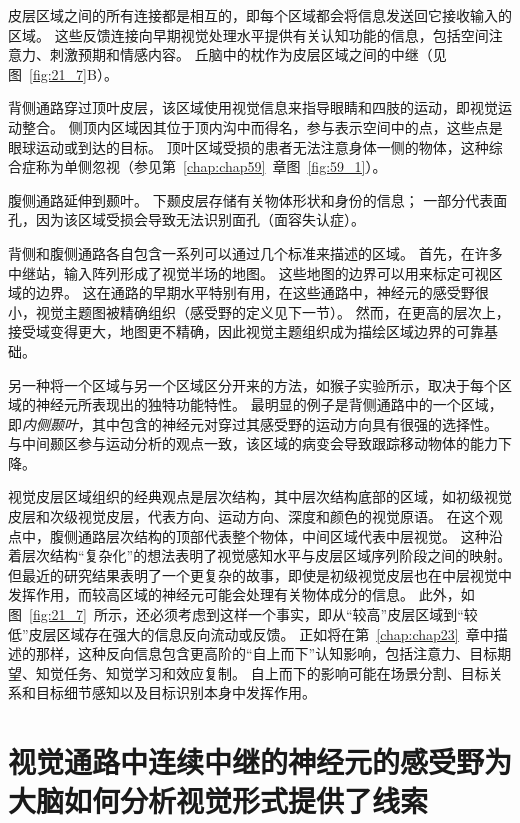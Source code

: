 皮层区域之间的所有连接都是相互的，即每个区域都会将信息发送回它接收输入的区域。
这些反馈连接向早期视觉处理水平提供有关认知功能的信息，包括空间注意力、刺激预期和情感内容。
丘脑中的枕作为皮层区域之间的中继（见图~\ref{fig:21_7}B）。


背侧通路穿过顶叶皮层，该区域使用视觉信息来指导眼睛和四肢的运动，即视觉运动整合。
侧顶内区域因其位于顶内沟中而得名，参与表示空间中的点，这些点是眼球运动或到达的目标。
顶叶区域受损的患者无法注意身体一侧的物体，这种综合症称为单侧忽视（参见第~\ref{chap:chap59}~章图~\ref{fig:59_1}）。


腹侧通路延伸到颞叶。
下颞皮层存储有关物体形状和身份的信息；
一部分代表面孔，因为该区域受损会导致无法识别面孔（面容失认症）。


背侧和腹侧通路各自包含一系列可以通过几个标准来描述的区域。
首先，在许多中继站，输入阵列形成了视觉半场的地图。 
这些地图的边界可以用来标定可视区域的边界。
这在通路的早期水平特别有用，在这些通路中，神经元的感受野很小，视觉主题图被精确组织（感受野的定义见下一节）。
然而，在更高的层次上，接受域变得更大，地图更不精确，因此视觉主题组织成为描绘区域边界的可靠基础。


另一种将一个区域与另一个区域区分开来的方法，如猴子实验所示，取决于每个区域的神经元所表现出的独特功能特性。
最明显的例子是背侧通路中的一个区域，即\textit{内侧颞叶}，其中包含的神经元对穿过其感受野的运动方向具有很强的选择性。
与中间颞区参与运动分析的观点一致，该区域的病变会导致跟踪移动物体的能力下降。


视觉皮层区域组织的经典观点是层次结构，其中层次结构底部的区域，如初级视觉皮层和次级视觉皮层，代表方向、运动方向、深度和颜色的视觉原语。
在这个观点中，腹侧通路层次结构的顶部代表整个物体，中间区域代表中层视觉。
这种沿着层次结构“复杂化”的想法表明了视觉感知水平与皮层区域序列阶段之间的映射。
但最近的研究结果表明了一个更复杂的故事，即使是初级视觉皮层也在中层视觉中发挥作用，而较高区域的神经元可能会处理有关物体成分的信息。
此外，如图~\ref{fig:21_7}~所示，还必须考虑到这样一个事实，即从“较高”皮层区域到“较低”皮层区域存在强大的信息反向流动或反馈。
正如将在第~\ref{chap:chap23}~章中描述的那样，这种反向信息包含更高阶的“自上而下”认知影响，包括注意力、目标期望、知觉任务、知觉学习和效应复制。
自上而下的影响可能在场景分割、目标关系和目标细节感知以及目标识别本身中发挥作用。



\section{视觉通路中连续中继的神经元的感受野为大脑如何分析视觉形式提供了线索}

